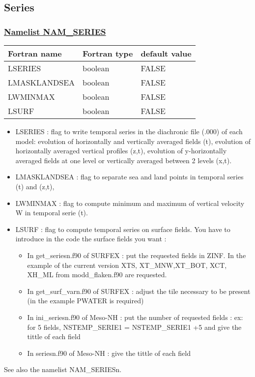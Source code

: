 \subsection{Series}
 
\subsubsection{\underline{Namelist NAM\_SERIES}}
\label{ss:series}
\begin{center}
\begin{tabular}{|l|l|l| }
\hline 
 Fortran name & Fortran type  & default value \\
\hline
LSERIES      & boolean & FALSE \\
LMASKLANDSEA & boolean & FALSE \\
LWMINMAX     & boolean & FALSE \\
LSURF        & boolean & FALSE \\
\hline
\end{tabular}
\end{center}

\begin{itemize}
\item LSERIES :
 flag to write temporal series in the diachronic file (.000) of each model:
evolution of horizontally and vertically averaged fields (t), 
evolution of horizontally averaged vertical profiles (z,t), 
evolution of y-horizontally averaged fields at one level or vertically averaged between 2 levels (x,t). 
\item LMASKLANDSEA :
 flag to separate sea and land points in temporal series (t) and (z,t),
\item LWMINMAX :
 flag to compute minimum and maximum of vertical velocity W in temporal serie
(t).
\item LSURF : flag to compute temporal series on surface fields.
You have to introduce in the code the surface fields you want  : 
\begin{itemize}
\item In  get\_seriesn.f90 of SURFEX : put the requested fields in ZINF. In the example of the current version XTS, XT\_MNW,XT\_BOT, XCT, XH\_ML from modd\_flaken.f90 are requested.
\item In get\_surf\_varn.f90 of SURFEX : adjust the tile necessary to be present (in the example PWATER is required)
\item In ini\_seriesn.f90 of Meso-NH : put the number of requested fields  : ex: for 5 fields, NSTEMP\_SERIE1 = NSTEMP\_SERIE1 +5 and give the tittle of each field
\item In seriesn.f90 of Meso-NH : give the tittle of each field
\end{itemize}
\end{itemize}
See also the namelist NAM\_SERIESn. \\

